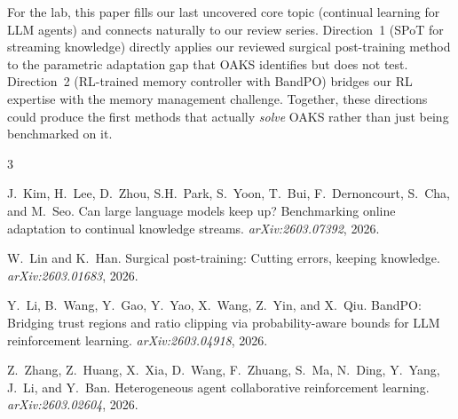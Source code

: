 \documentclass[11pt]{article}
\begin{document}
For the lab, this paper fills our last uncovered core topic (continual learning for LLM agents) and connects naturally to our review series. Direction~1 (SPoT for streaming knowledge) directly applies our reviewed surgical post-training method to the parametric adaptation gap that OAKS identifies but does not test. Direction~2 (RL-trained memory controller with BandPO) bridges our RL expertise with the memory management challenge. Together, these directions could produce the first methods that actually \emph{solve} OAKS rather than just being benchmarked on it.


\begin{thebibliography}{3}

J.~Kim, H.~Lee, D.~Zhou, S.H.~Park, S.~Yoon, T.~Bui, F.~Dernoncourt, S.~Cha, and M.~Seo.
\newblock Can large language models keep up? Benchmarking online adaptation to continual knowledge streams.
\newblock \emph{arXiv:2603.07392}, 2026.

W.~Lin and K.~Han.
\newblock Surgical post-training: Cutting errors, keeping knowledge.
\newblock \emph{arXiv:2603.01683}, 2026.

Y.~Li, B.~Wang, Y.~Gao, Y.~Yao, X.~Wang, Z.~Yin, and X.~Qiu.
\newblock BandPO: Bridging trust regions and ratio clipping via probability-aware bounds for LLM reinforcement learning.
\newblock \emph{arXiv:2603.04918}, 2026.

Z.~Zhang, Z.~Huang, X.~Xia, D.~Wang, F.~Zhuang, S.~Ma, N.~Ding, Y.~Yang, J.~Li, and Y.~Ban.
\newblock Heterogeneous agent collaborative reinforcement learning.
\newblock \emph{arXiv:2603.02604}, 2026.

\end{thebibliography}
\end{document}
